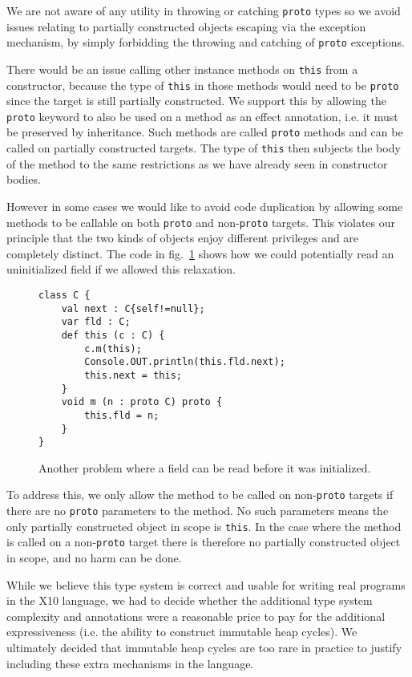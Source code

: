 We are not aware of any utility in throwing or catching \texttt{proto} types so
we avoid issues relating to partially constructed objects escaping via the
exception mechanism, by simply forbidding the throwing and catching of
\texttt{proto} exceptions.

There would be an issue calling other instance methods on \texttt{this} from a
constructor, because the type of \texttt{this} in those methods would need to
be \texttt{proto} since the target is still partially constructed.  We support
this by allowing the \texttt{proto} keyword to also be used on a method as an
effect annotation, i.e. it must be preserved by inheritance.  Such methods are
called \texttt{proto} methods and can be called on partially constructed
targets.  The type of \texttt{this} then subjects the body of the method to the
same restrictions as we have already seen in constructor bodies.

However in some cases we would like to avoid code duplication by allowing some
methods to be callable on both \texttt{proto} and non-\texttt{proto} targets.
This violates our principle that the two kinds of objects enjoy different
privileges and are completely distinct.  The code in fig.~\ref{Figure:Problem2}
shows how we could potentially read an uninitialized field if we allowed this
relaxation.

\begin{figure}
\begin{lstlisting}
class C {
    val next : C{self!=null};
    var fld : C;
    def this (c : C) {
        c.m(this);
        Console.OUT.println(this.fld.next);
        this.next = this;
    }
    void m (n : proto C) proto {
        this.fld = n;
    }
}
\end{lstlisting}
\caption{Another problem where a field can be read before it was initialized.}
\label{Figure:Problem2}
\end{figure}

To address this, we only allow the method to be called on non-\texttt{proto}
targets if there are no \texttt{proto} parameters to the method.  No such
parameters means the only partially constructed object in scope is
\texttt{this}.  In the case where the method is called on a non-\texttt{proto}
target there is therefore no partially constructed object in scope, and no harm
can be done.

While we believe this type system is correct and usable for writing real
programs in the X10 language, we had to decide whether the additional type
system complexity and annotations were a reasonable price to pay for the
additional expressiveness (i.e. the ability to construct immutable heap
cycles).  We ultimately decided that immutable heap cycles are too rare in
practice to justify including these extra mechanisms in the language.
